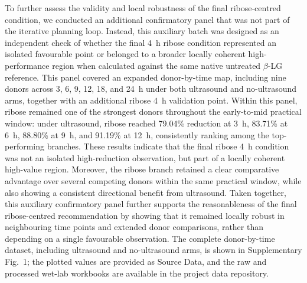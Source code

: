 To further assess the validity and local robustness of the final ribose-centred condition, we conducted an additional confirmatory panel that was not part of the iterative planning loop. Instead, this auxiliary batch was designed as an independent check of whether the final 4~h ribose condition represented an isolated favourable point or belonged to a broader locally coherent high-performance region when calculated against the same native untreated $\beta$-LG reference. This panel covered an expanded donor-by-time map, including nine donors across 3, 6, 9, 12, 18, and 24~h under both ultrasound and no-ultrasound arms, together with an additional ribose 4~h validation point. Within this panel, ribose remained one of the strongest donors throughout the early-to-mid practical window: under ultrasound, ribose reached 79.04\% reduction at 3~h, 83.71\% at 6~h, 88.80\% at 9~h, and 91.19\% at 12~h, consistently ranking among the top-performing branches. These results indicate that the final ribose 4~h condition was not an isolated high-reduction observation, but part of a locally coherent high-value region. Moreover, the ribose branch retained a clear comparative advantage over several competing donors within the same practical window, while also showing a consistent directional benefit from ultrasound. Taken together, this auxiliary confirmatory panel further supports the reasonableness of the final ribose-centred recommendation by showing that it remained locally robust in neighbouring time points and extended donor comparisons, rather than depending on a single favourable observation.
The complete donor-by-time dataset, including ultrasound and no-ultrasound arms, is shown in Supplementary Fig.~1; the plotted values are provided as Source Data, and the raw and processed wet-lab workbooks are available in the project data repository.

